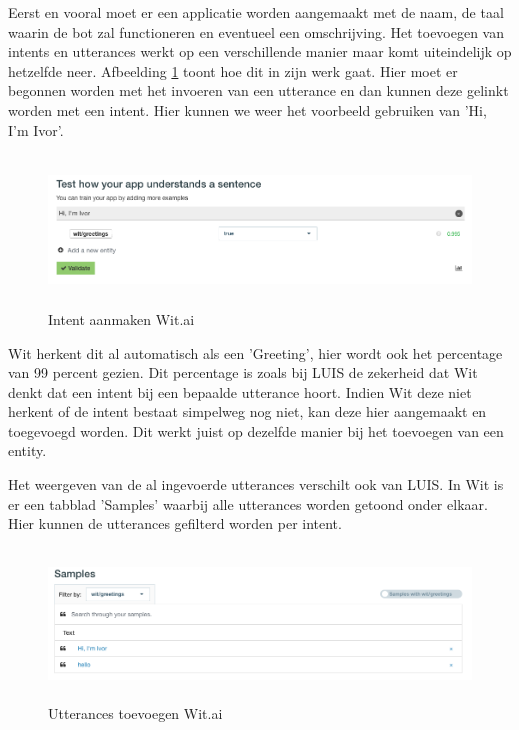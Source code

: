 Eerst en vooral moet er een applicatie worden aangemaakt met de naam, de taal waarin de bot zal functioneren en eventueel een omschrijving. Het toevoegen van intents en utterances werkt op een verschillende manier maar komt uiteindelijk op hetzelfde neer. Afbeelding \ref{fig:intentsWit} toont hoe dit in zijn werk gaat. Hier moet er begonnen worden met het invoeren van een utterance en dan kunnen deze gelinkt worden met een intent. Hier kunnen we weer het voorbeeld gebruiken van 'Hi, I'm Ivor'.

\begin{figure}[h!]
	\centering
	\includegraphics[height=4cm]{img/wit_intents.png}
	\caption{Intent aanmaken Wit.ai}
	\label{fig:intentsWit}
\end{figure}

Wit herkent dit al automatisch als een 'Greeting', hier wordt ook het percentage van 99 percent gezien. Dit percentage is zoals bij LUIS de zekerheid dat Wit denkt dat een intent bij een bepaalde utterance hoort. Indien Wit deze niet herkent of de intent bestaat simpelweg nog niet, kan deze hier aangemaakt en toegevoegd worden. Dit werkt juist op dezelfde manier bij het toevoegen van een entity.

Het weergeven van de al ingevoerde utterances verschilt ook van LUIS. In Wit is er een tabblad 'Samples' waarbij alle utterances worden getoond onder elkaar. Hier kunnen de utterances gefilterd worden per intent.

\begin{figure}[h!]
	\centering
	\includegraphics[height=4cm]{img/samples.png}
	\caption{Utterances toevoegen Wit.ai}
	\label{fig:samples}
\end{figure}

